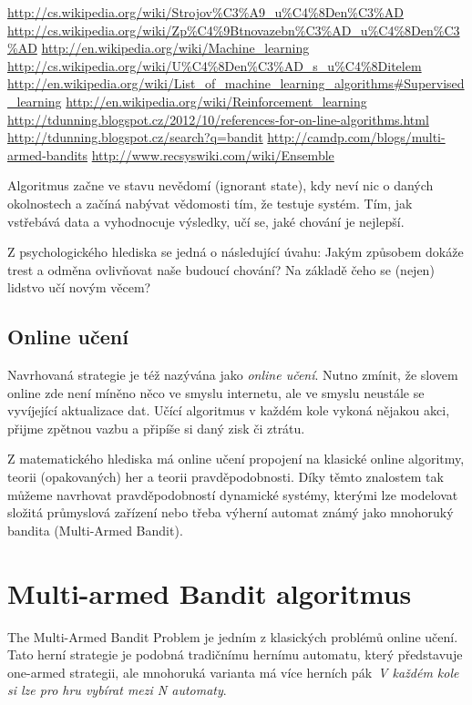 \documentclass[thesis=M,czech]{FITthesis}[2014/05/07]
\begin{document}
\url{http://cs.wikipedia.org/wiki/Strojov%C3%A9_u%C4%8Den%C3%AD}
\url{http://cs.wikipedia.org/wiki/Zp%C4%9Btnovazebn%C3%AD_u%C4%8Den%C3%AD}
\url{http://en.wikipedia.org/wiki/Machine_learning}
\url{http://cs.wikipedia.org/wiki/U%C4%8Den%C3%AD_s_u%C4%8Ditelem}
\url{http://en.wikipedia.org/wiki/List_of_machine_learning_algorithms#Supervised_learning}
\url{http://en.wikipedia.org/wiki/Reinforcement_learning}
\url{http://tdunning.blogspot.cz/2012/10/references-for-on-line-algorithms.html}
\url{http://tdunning.blogspot.cz/search?q=bandit}
\url{http://camdp.com/blogs/multi-armed-bandits}
\url{http://www.recsyswiki.com/wiki/Ensemble}

Algoritmus začne ve stavu nevědomí (ignorant state), kdy neví nic o daných okolnostech a začíná nabývat vědomosti tím, že testuje systém. Tím, jak vstřebává data a vyhodnocuje výsledky, učí se, jaké chování je nejlepší.

Z psychologického hlediska se jedná o následující úvahu: Jakým způsobem dokáže trest a odměna ovlivňovat naše budoucí chování? Na základě čeho se (nejen) lidstvo učí novým věcem?

\subsection{Online učení}

Navrhovaná strategie je též nazývána jako \emph{online učení}. Nutno zmínit, že slovem online zde není míněno něco ve smyslu internetu, ale ve smyslu neustále se vyvíjející aktualizace dat. Učící algoritmus v každém kole vykoná nějakou akci, přijme zpětnou vazbu a připíše si daný zisk či ztrátu.

Z matematického hlediska má online učení propojení na klasické online algoritmy, teorii (opakovaných) her a teorii pravděpodobnosti. Díky těmto znalostem tak můžeme navrhovat pravděpodobností dynamické systémy, kterými lze modelovat složitá průmyslová zařízení nebo třeba výherní automat známý jako mnohoruký bandita (Multi-Armed Bandit).

\section{Multi-armed Bandit algoritmus}
The Multi-Armed Bandit Problem je jedním z klasických problémů online učení. Tato herní strategie je podobná tradičnímu hernímu automatu, který představuje one-armed strategii, ale mnohoruká varianta má více herních pák~\emph{V každém kole si lze pro hru vybírat mezi N automaty}. 
\end{document}
